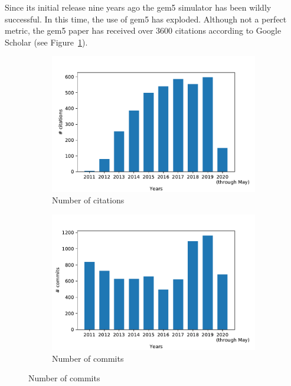 Since its initial release nine years ago the gem5 simulator has been wildly successful.
In this time, the use of gem5 has exploded.
Although not a perfect metric, the gem5 paper has received over 3600 citations according to Google Scholar (see Figure~\ref{fig:citations}).

\begin{figure}
    \centering
    \begin{subfigure}{0.28\linewidth}
      \centering
      \includegraphics[width=\linewidth]{fig/gem5_citations}
      \caption{Number of citations}
      \label{fig:citations}
    \end{subfigure}
    \begin{subfigure}{0.28\linewidth}
      \centering
      \includegraphics[width=\linewidth]{fig/gem5_commits}
      \caption{Number of commits}
      \label{fig:commits}
    \end{subfigure}

\end{figure}
